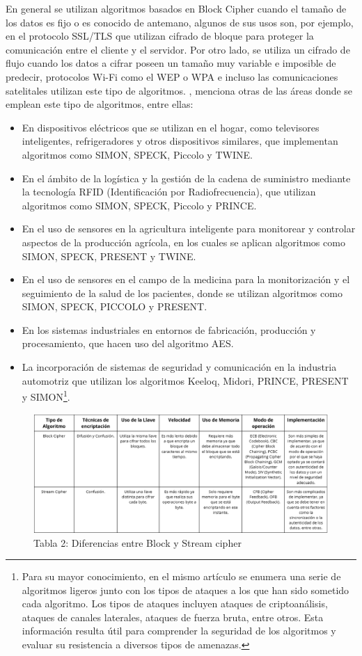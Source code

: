 \documentclass[a4paper,10pt]{article}
\begin{document}
	En general se utilizan algoritmos basados en Block Cipher cuando el tamaño de los datos es fijo o es conocido de antemano, algunos de sus usos son, por ejemplo, en el protocolo SSL/TLS que utilizan cifrado de bloque para proteger la comunicación entre el cliente y el servidor. Por otro lado, se utiliza un cifrado de flujo cuando los datos a cifrar poseen un tamaño muy variable e imposible de predecir, protocolos Wi-Fi como el WEP o WPA e incluso las comunicaciones satelitales utilizan este tipo de algoritmos. \textcite{thakor2020lightweight}, menciona otras de las áreas donde se emplean este tipo de algoritmos, entre ellas:
	\begin{itemize}
		\item En dispositivos eléctricos que se utilizan en el hogar, como televisores inteligentes, refrigeradores y otros dispositivos similares, que implementan algoritmos como SIMON, SPECK, Piccolo y TWINE. 
		\item En el ámbito de la logística y la gestión de la cadena de suministro mediante la tecnología RFID (Identificación por Radiofrecuencia), que utilizan algoritmos como SIMON, SPECK, Piccolo y PRINCE.
		\item En el uso de sensores en la agricultura inteligente para monitorear y controlar aspectos de la producción agrícola, en los cuales se aplican algoritmos como SIMON, SPECK, PRESENT y TWINE.
		\item En el uso de sensores en el campo de la medicina para la monitorización y el seguimiento de la salud de los pacientes, donde se utilizan algoritmos como SIMON, SPECK, PICCOLO y PRESENT.
		\item En los sistemas industriales en entornos de fabricación, producción y procesamiento, que hacen uso del algoritmo AES.
		\item La incorporación de sistemas de seguridad y comunicación en la industria automotriz que utilizan los algoritmos Keeloq, Midori, PRINCE, PRESENT y SIMON\footnote{Para su mayor conocimiento, en el mismo artículo se enumera una serie de algoritmos ligeros junto con los tipos de ataques a los que han sido sometido cada algoritmo. Los tipos de ataques incluyen ataques de criptoanálisis, ataques de canales laterales, ataques de fuerza bruta, entre otros. Esta información resulta útil para comprender la seguridad de los algoritmos y evaluar su resistencia a diversos tipos de amenazas.}.
	\end{itemize}
	\begin{figure}[h]
		\centering
		\includegraphics[width=1.0\textwidth]{tablaBlockStreamCipher.PNG}
		\caption{Tabla 2: Diferencias entre Block y Stream cipher}
		\label{Diferencias_Block_Stream_Cipher}
	\end{figure}
\end{document}
